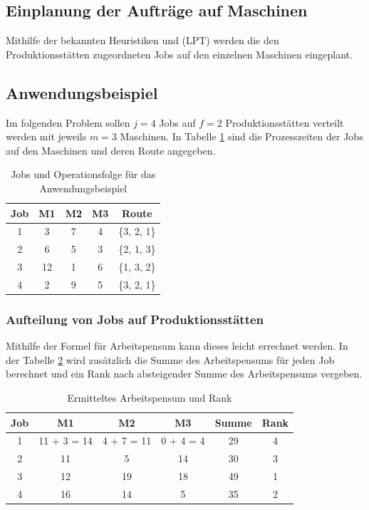 \documentclass[final, english, ngerman, a4paper, 12pt, %
numbers=noenddot,
cd=true,
cdfont=false,cdfont=nohead,cdfont=nodin,
cdmath=false,
cdhead=false,
cdfoot=true,
cdcover=monochrome,
cdgeometry=symmetric,
declaration=heading,
declaration=notoc,
abstract=heading,
]{tudscrreprt}
\begin{document}
\subsection{Einplanung der Aufträge auf Maschinen}
Mithilfe der bekannten Heuristiken  und  (LPT) werden die den Produktionsstätten zugeordneten Jobs auf den einzelnen Maschinen eingeplant.

\subsection{Anwendungsbeispiel}
Im folgenden Problem sollen $j=4$ Jobs auf $f=2$ Produktionsstätten verteilt werden mit jeweils $m=3$ Maschinen. In Tabelle \ref{tab:problem} sind die Prozesszeiten der Jobs auf den Maschinen und deren Route angegeben. 

\begin{table}[H]
	\centering
	\begin{tabular}{ccccc}
		\toprule
		Job & M1 & M2 & M3 & Route \\
		\midrule
		1   & 3  & 7  & 4  & \{3, 2, 1\} \\
		2   & 6  & 5  & 3  & \{2, 1, 3\} \\
		3   & 12 & 1  & 6  & \{1, 3, 2\} \\
		4   & 2  & 9  & 5  & \{3, 2, 1\} \\
		\bottomrule
	\end{tabular}
	\caption{Jobs und Operationsfolge für das Anwendungsbeispiel}
	\label{tab:problem}
\end{table}

\subsubsection{Aufteilung von Jobs auf Produktionsstätten}
Mithilfe der Formel für Arbeitspensum kann dieses leicht errechnet werden. In der Tabelle \ref{tab:pensum} wird zusätzlich die Summe des Arbeitspensums für jeden Job berechnet und ein Rank nach absteigender Summe des Arbeitspensums vergeben.

\begin{table}[H]
	\centering
	\begin{tabular}{cccccc}
		\toprule
		Job & M1 & M2 & M3 & Summe & Rank \\
		\midrule
		1   & 11 + 3 = 14 & 4 + 7 = 11 & 0 + 4 = 4 & 29 & 4 \\
		2   & 11 & 5 & 14 & 30 & 3  \\
		3   & 12 & 19 & 18 & 49 & 1  \\
		4   & 16 & 14 & 5 & 35 & 2  \\
		\bottomrule
	\end{tabular}
	\caption{Ermitteltes Arbeitspensum und Rank}
	\label{tab:pensum}
\end{table}
\end{document}
